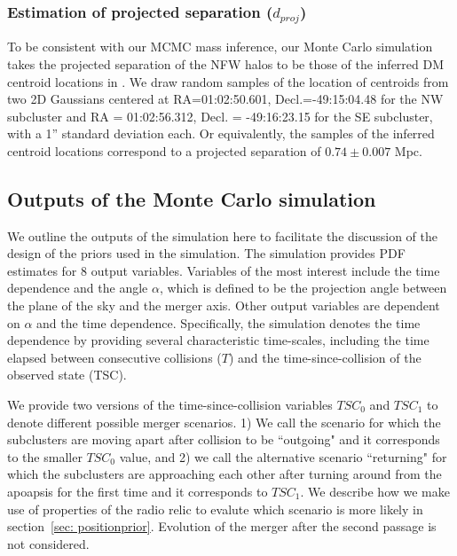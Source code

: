 
\subsubsection{Estimation of projected separation ($d_{proj}$)} 
To be consistent with our MCMC mass inference, our Monte Carlo simulation takes 
the projected separation of the NFW halos to be those of the inferred
DM centroid locations in \citealt{Jee13}. We draw random samples
 of the location of centroids from two 2D Gaussians centered at
 RA=01:02:50.601, Decl.=-49:15:04.48 for the NW subcluster and RA =
 01:02:56.312, Decl. = -49:16:23.15 for the SE
subcluster, with a 1'' standard deviation each. Or equivalently, the
samples of the inferred centroid locations correspond to a projected separation of
$0.74\pm {0.007}$ Mpc. 

\subsection{Outputs of the Monte Carlo simulation}\label{sec: outputs}
%

We outline the outputs of the simulation here to facilitate the discussion
of the design of the priors used in the simulation. The simulation
provides PDF estimates for 8 output variables. Variables
of the most interest include the time dependence and the angle $\alpha$, which is
defined to be the projection angle between the plane of the sky and the merger axis. Other output variables are dependent on $\alpha$ and the time
dependence. Specifically, the simulation denotes the time dependence by
providing several characteristic time-scales, including the time
elapsed between consecutive collisions
($T$) and the time-since-collision of the observed state (TSC).  

We provide two versions of the time-since-collision variables $TSC_0$ and
$TSC_1$ to denote different possible merger scenarios. 1) We call the scenario for which the subclusters are
moving apart after collision to be ``outgoing" and it corresponds to the
smaller $TSC_0$ value, and 2) we call the alternative scenario 
``returning" for which the subclusters are approaching each other after turning
around from the apoapsis for the first time and it corresponds to $TSC_1$.
We describe how we make use of properties of the radio relic to evalute
which scenario is more likely in
section~\ref{sec: positionprior}. Evolution of the merger after the second
passage is not considered.
 
